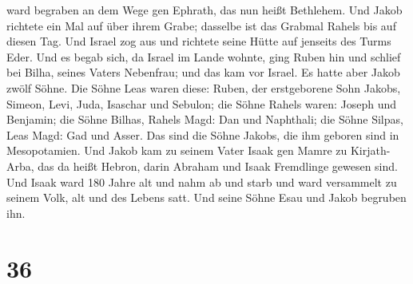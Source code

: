 ward begraben an dem Wege gen Ephrath, das nun heißt Bethlehem.
 Und Jakob richtete ein Mal auf über ihrem Grabe;
dasselbe ist das Grabmal Rahels bis auf diesen Tag.  Und
Israel zog aus und richtete seine Hütte auf jenseits des Turms Eder.
 Und es begab sich, da Israel im Lande wohnte, ging Ruben
hin und schlief bei Bilha, seines Vaters Nebenfrau; und das kam vor
Israel. Es hatte aber Jakob zwölf Söhne.  Die Söhne Leas
waren diese: Ruben, der erstgeborene Sohn Jakobs, Simeon, Levi, Juda,
Isaschar und Sebulon;  die Söhne Rahels waren: Joseph und
Benjamin;  die Söhne Bilhas, Rahels Magd: Dan und
Naphthali;  die Söhne Silpas, Leas Magd: Gad und Asser.
Das sind die Söhne Jakobs, die ihm geboren sind in Mesopotamien.
 Und Jakob kam zu seinem Vater Isaak gen Mamre zu
Kirjath-Arba, das da heißt Hebron, darin Abraham und Isaak Fremdlinge
gewesen sind.  Und Isaak ward 180 Jahre alt
 und nahm ab und starb und ward versammelt zu seinem
Volk, alt und des Lebens satt. Und seine Söhne Esau und Jakob begruben
ihn.

\hypertarget{section-35}{%
\section{36}\label{section-35}}

